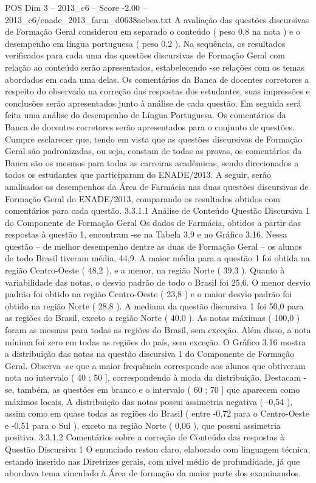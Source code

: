 \begin{textsample}{POS Dim 3 – 2013\_c6 – Score -2.00 – 2013\_c6/enade\_2013\_farm\_d0638aebea.txt}
A avaliação das questões discursivas de Formação Geral considerou em separado o conteúdo ( peso 0,8 na nota ) e o desempenho em língua portuguesa ( peso 0,2 ).
Na sequência, os resultados verificados para cada uma das questões discursivas de Formação Geral com relação ao conteúdo serão apresentados, estabelecendo -se relações com os temas abordados em cada uma delas.
Os comentários da Banca de docentes corretores a respeito do observado na correção das respostas dos estudantes, suas impressões e conclusões serão apresentados junto à análise de cada questão.
Em seguida será feita uma análise do desempenho de Língua Portuguesa.
Os comentários da Banca de docentes corretores serão apresentados para o conjunto de questões.
Cumpre esclarecer que, tendo em vista que as questões discursivas de Formação Geral são padronizadas, ou seja, constam de todas as provas, os comentários da Banca são os mesmos para todas as carreiras acadêmicas, sendo direcionados a todos os estudantes que participaram do ENADE/2013.
A seguir, serão analisados os desempenhos da Área de Farmácia nas duas questões discursivas de Formação Geral do ENADE/2013, comparando os resultados obtidos com comentários para cada questão. 3.3.1.1 Análise de Conteúdo Questão Discursiva 1 do Componente de Formação Geral Os dados de Farmácia, obtidos a partir das respostas à questão 1, encontram -se na Tabela 3.9 e no Gráfico 3.16.
Nessa questão – de melhor desempenho dentre as duas de Formação Geral – os alunos de todo Brasil tiveram média, 44,9.
A maior média para a questão 1 foi obtida na região Centro-Oeste ( 48,2 ), e a menor, na região Norte ( 39,3 ).
Quanto à variabilidade das notas, o desvio padrão de todo o Brasil foi 25,6.
O menor desvio padrão foi obtido na região Centro-Oeste ( 23,8 ) e o maior desvio padrão foi obtido na região Norte ( 28,8 ).
A mediana da questão discursiva 1 foi 50,0 para as regiões do Brasil, exceto a região Norte ( 40,0 ).
As notas máximas ( 100,0 ) foram as mesmas para todas as regiões do Brasil, sem exceção.
Além disso, a nota mínima foi zero em todas as regiões do país, sem exceção.
O Gráfico 3.16 mostra a distribuição das notas na questão discursiva 1 do Componente de Formação Geral.
Observa -se que a maior frequência corresponde aos alunos que obtiveram nota no intervalo ( 40 ; 50 ], correspondendo à moda da distribuição.
Destacam -se, também, as questões em branco e o intervalo ( 60 ; 70 ] que aparecem como máximos locais.
A distribuição das notas possui assimetria negativa ( -0,54 ), assim como em quase todas as regiões do Brasil ( entre -0,72 para o Centro-Oeste e -0,51 para o Sul ), exceto na região Norte ( 0,06 ), que possui assimetria positiva. 3.3.1.2 Comentários sobre a correção de Conteúdo das respostas à Questão Discursiva 1 O enunciado restou claro, elaborado com linguagem técnica, estando inserido nas Diretrizes gerais, com nível médio de profundidade, já que abordava tema vinculado à Área de formação da maior parte dos examinandos.

\end{textsample}
